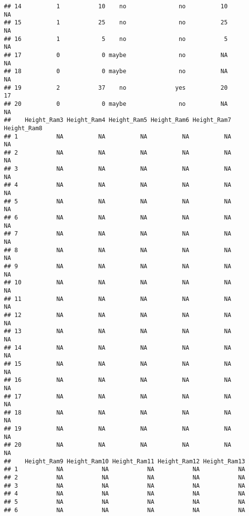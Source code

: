 \documentclass[]{article}
\begin{document}
\begin{verbatim}
## 14          1           10    no               no          10          NA
## 15          1           25    no               no          25          NA
## 16          1            5    no               no           5          NA
## 17          0            0 maybe               no          NA          NA
## 18          0            0 maybe               no          NA          NA
## 19          2           37    no              yes          20          17
## 20          0            0 maybe               no          NA          NA
##    Height_Ram3 Height_Ram4 Height_Ram5 Height_Ram6 Height_Ram7 Height_Ram8
## 1           NA          NA          NA          NA          NA          NA
## 2           NA          NA          NA          NA          NA          NA
## 3           NA          NA          NA          NA          NA          NA
## 4           NA          NA          NA          NA          NA          NA
## 5           NA          NA          NA          NA          NA          NA
## 6           NA          NA          NA          NA          NA          NA
## 7           NA          NA          NA          NA          NA          NA
## 8           NA          NA          NA          NA          NA          NA
## 9           NA          NA          NA          NA          NA          NA
## 10          NA          NA          NA          NA          NA          NA
## 11          NA          NA          NA          NA          NA          NA
## 12          NA          NA          NA          NA          NA          NA
## 13          NA          NA          NA          NA          NA          NA
## 14          NA          NA          NA          NA          NA          NA
## 15          NA          NA          NA          NA          NA          NA
## 16          NA          NA          NA          NA          NA          NA
## 17          NA          NA          NA          NA          NA          NA
## 18          NA          NA          NA          NA          NA          NA
## 19          NA          NA          NA          NA          NA          NA
## 20          NA          NA          NA          NA          NA          NA
##    Height_Ram9 Height_Ram10 Height_Ram11 Height_Ram12 Height_Ram13
## 1           NA           NA           NA           NA           NA
## 2           NA           NA           NA           NA           NA
## 3           NA           NA           NA           NA           NA
## 4           NA           NA           NA           NA           NA
## 5           NA           NA           NA           NA           NA
## 6           NA           NA           NA           NA           NA

\end{verbatim}
\end{document}
